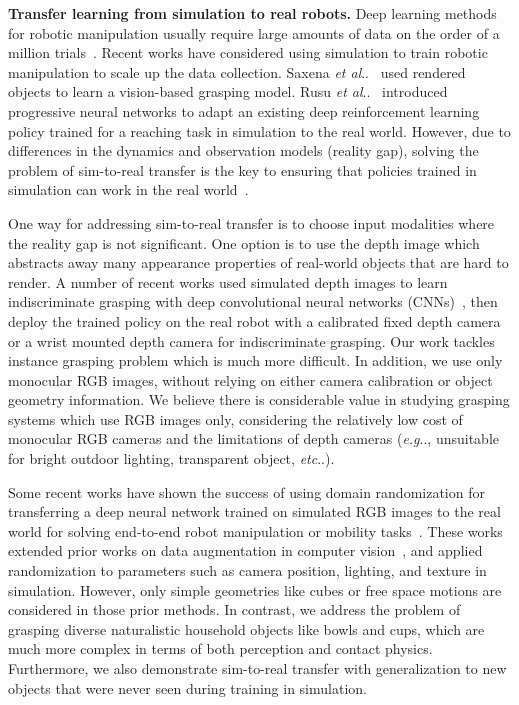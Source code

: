 \documentclass[letterpaper, 10 pt, conference]{ieeeconf}  %
\makeatletter
\newcommand{\etal}{~et al.~}
\DeclareRobustCommand\onedot{\futurelet\@let@token\@onedot}
\def\@onedot{\ifx\@let@token.\else.\null\fi\xspace}
\def\eg{\emph{e.g}\onedot} \def\Eg{\emph{E.g}\onedot}
\def\etc{\emph{etc}\onedot} \def\vs{\emph{vs}\onedot}
\def\etal{\emph{et al}\onedot}
\makeatother
\begin{document}
\textbf{Transfer learning from simulation to real robots.} Deep learning methods for robotic manipulation usually require large amounts of data on the order of a million trials~\cite{levine2016learning}. Recent works have considered using simulation to train robotic manipulation to scale up the data collection. Saxena \etal~\cite{saxena2008robotic} used rendered objects to learn a vision-based grasping model. Rusu \etal ~\cite{rusu2016sim} introduced progressive neural networks to adapt an existing deep reinforcement learning policy trained for a reaching task in simulation to the real world. However, due to differences in the dynamics and observation models (reality gap), solving the problem of sim-to-real transfer is the key to ensuring that policies trained in simulation can work in the real world~\cite{taylor2009transfer}.

One way for addressing sim-to-real transfer is to choose input modalities where the reality gap is not significant. One option is to use the depth image which abstracts away many appearance properties of real-world objects that are hard to render. A number of recent works used simulated depth images to learn indiscriminate grasping with deep convolutional neural networks (CNNs)~\cite{mahler2017dex,viereck2017learning}, then deploy the trained policy on the real robot with a calibrated fixed depth camera or a wrist mounted depth camera for indiscriminate grasping. Our work tackles instance grasping problem which is much more difficult. In addition, we use only monocular RGB images, without relying on either camera calibration or object geometry information. We believe there is considerable value in studying grasping systems which use RGB images only, considering the relatively low cost of monocular RGB cameras and the limitations of depth cameras (\eg, unsuitable for bright outdoor lighting, transparent object, \etc).

Some recent works have shown the success of using domain randomization for transferring a deep neural network trained on simulated RGB images to the real world for solving end-to-end robot manipulation or mobility tasks~\cite{sadeghi2016cad2rl,tobin2017domain,james2017transferring}. These works extended prior works on data augmentation in computer vision~\cite{simard2003best}, and applied randomization to parameters such as camera position, lighting, and texture in simulation. However, only simple geometries like cubes or free space motions are considered in those prior methods. In contrast, we address the problem of grasping diverse naturalistic household objects like bowls and cups, which are much more complex in terms of both perception and contact physics. Furthermore, we also demonstrate sim-to-real transfer with generalization to new objects that were never seen during training in simulation.
\end{document}
